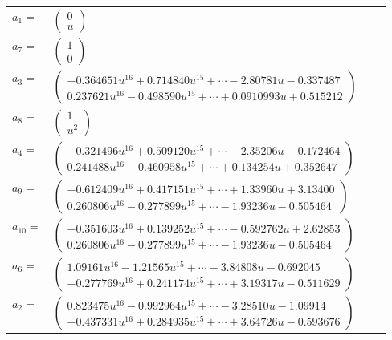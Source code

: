 \documentclass[1p]{elsarticle_modified}
\theoremstyle{definition}
\begin{document}
\begin{tabular}{m{7pt} m{180pt} m{7pt} m{180pt} }
\flushright $a_{1}=$&$\begin{pmatrix}0\\u\end{pmatrix}$ \\
\flushright $a_{7}=$&$\begin{pmatrix}1\\0\end{pmatrix}$ \\
\flushright $a_{3}=$&$\begin{pmatrix}-0.364651 u^{16}+0.714840 u^{15}+\cdots-2.80781 u-0.337487\\0.237621 u^{16}-0.498590 u^{15}+\cdots+0.0910993 u+0.515212\end{pmatrix}$ \\
\flushright $a_{8}=$&$\begin{pmatrix}1\\u^2\end{pmatrix}$ \\
\flushright $a_{4}=$&$\begin{pmatrix}-0.321496 u^{16}+0.509120 u^{15}+\cdots-2.35206 u-0.172464\\0.241488 u^{16}-0.460958 u^{15}+\cdots+0.134254 u+0.352647\end{pmatrix}$ \\
\flushright $a_{9}=$&$\begin{pmatrix}-0.612409 u^{16}+0.417151 u^{15}+\cdots+1.33960 u+3.13400\\0.260806 u^{16}-0.277899 u^{15}+\cdots-1.93236 u-0.505464\end{pmatrix}$ \\
\flushright $a_{10}=$&$\begin{pmatrix}-0.351603 u^{16}+0.139252 u^{15}+\cdots-0.592762 u+2.62853\\0.260806 u^{16}-0.277899 u^{15}+\cdots-1.93236 u-0.505464\end{pmatrix}$ \\
\flushright $a_{6}=$&$\begin{pmatrix}1.09161 u^{16}-1.21565 u^{15}+\cdots-3.84808 u-0.692045\\-0.277769 u^{16}+0.241174 u^{15}+\cdots+3.19317 u-0.511629\end{pmatrix}$ \\
\flushright $a_{2}=$&$\begin{pmatrix}0.823475 u^{16}-0.992964 u^{15}+\cdots-3.28510 u-1.09914\\-0.437331 u^{16}+0.284935 u^{15}+\cdots+3.64726 u-0.593676\end{pmatrix}$ \\

\end{tabular}
\end{document}
